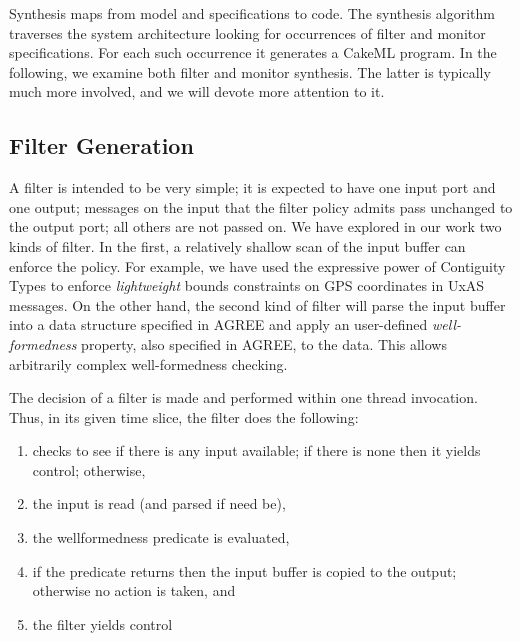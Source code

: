 Synthesis maps from model and specifications to code. The synthesis algorithm traverses the system architecture looking
for occurrences of filter and monitor specifications. For each such 
occurrence it generates a CakeML program. In the following, we examine both filter and monitor synthesis. The latter is typically much more involved, and we will devote more attention to it.

\subsection{Filter Generation}

A filter is intended to be very simple; it is expected to have one
input port and one output; messages on the input that the filter
policy admits pass unchanged to the output port; all others are not
passed on. We have explored in our work two kinds of filter. In the
first, a relatively shallow scan of the input buffer can enforce the
policy. For example, we have used the expressive power of Contiguity
Types \cite{contiguity-types} to enforce \emph{lightweight} bounds constraints
on GPS coordinates in UxAS messages. On the other hand, the second
kind of filter will parse the input buffer into a data structure
specified in AGREE and apply an user-defined \emph{well-formedness}
property, also specified in AGREE, to the data. This allows
arbitrarily complex well-formedness checking.

The decision of a filter is made and performed within one thread
invocation. Thus, in its given time slice, the filter does the following:

\begin{enumerate}

\item checks to see if there is any input available; if there is none
then it yields control; otherwise,

\item the input is read (and parsed if need be),

\item the wellformedness predicate is evaluated,

\item if the predicate returns  then the input buffer
 is copied to the output; otherwise no action is taken, and

\item the filter yields control
\end{enumerate}

